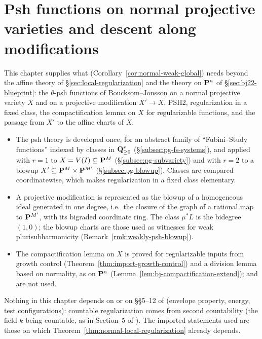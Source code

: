 \section{Psh functions on normal projective varieties and descent along modifications}\label{sec:projective-general}

This chapter supplies what \cite[Corollary~5.26]{FHX} (Corollary~\ref{cor:normal-weak-global}) needs beyond the
affine theory of \S\ref{sec:local-regularization} and the theory on $\mathbf{P}^n$ of \S\ref{sec:bj22-blueprint}: the
$\theta$-psh functions of Boucksom--Jonsson \cite[Definition~4.1]{BJ22} on a normal projective variety $X$ and on a
projective modification $X'\to X$, PSH2, regularization in a fixed class, the compactification lemma
\cite[Lemma~5.10(2)]{FHX} on $X$ for regularizable functions, and the passage from $X'$ to the affine charts of $X$.

\begin{itemize}
\item The psh theory is developed once, for an abstract family of ``Fubini--Study functions'' indexed by classes in
$\mathbf{Q}^r_{\ge0}$ (\S\ref{subsec:pg-fs-systems}), and applied with $r=1$ to $X=V(I)\subseteq\mathbf{P}^M$
(\S\ref{subsec:pg-subvariety}) and with $r=2$ to a blowup $X'\subseteq\mathbf{P}^M\times\mathbf{P}^{M'}$ (\S\ref{subsec:pg-blowup}).
Classes are compared coordinatewise, which makes regularization in a fixed class elementary.
\item A projective modification is represented as the blowup of a homogeneous ideal generated in one degree, i.e.\
the closure of the graph of a rational map to $\mathbf{P}^{M'}$, with its bigraded coordinate ring. The class $\mu^*L$ is the
bidegree $(1,0)$; the blowup charts are those used as witnesses for weak plurisubharmonicity
(Remark~\ref{rmk:weakly-psh-blowup}).
\item The compactification lemma on $X$ is proved for regularizable inputs from growth control
(Theorem~\ref{thm:import-growth-control}) and a division lemma based on normality, as on $\mathbf{P}^n$
(Lemma~\ref{lem:bj-compactification-extend}); \cite[Lemma~5.5]{FHX} and \cite{CLD12} are not used.
\end{itemize}

Nothing in this chapter depends on \cite[Theorem~6.21]{BJ22} or on \S\S5--12 of \cite{BJ22} (envelope property,
energy, test configurations): countable regularization comes from second countability (the field $k$ being
countable, as in Section~5 of \cite{FHX}). The imported statements used are those on which
Theorem~\ref{thm:normal-local-regularization} already depends.

